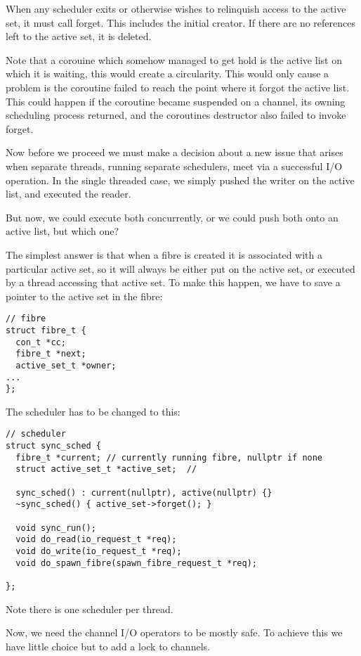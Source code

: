 \documentclass[oneside]{book}
\begin{document}
When any scheduler exits or otherwise wishes to relinquish access to the active
set, it must call forget. This includes the initial creator. If there are no
references left to the active set, it is deleted.

Note that a corouine which somehow managed to get hold is the active list on which it
is waiting, this would create a circularity. This would only cause a problem is the
coroutine failed to reach the point where it forgot the active list. This could
happen if the coroutine became suspended on a channel, its owning scheduling 
process returned, and the coroutines destructor also failed to invoke forget.

Now before we proceed we must make a decision about a new issue that
arises when separate threads, running separate schedulers, meet via
a successful I/O operation. In the single threaded case, we simply
pushed the writer on the active list, and executed the reader.

But now, we could execute both concurrently, or we could push
both onto an active list, but which one?

The simplest answer is that when a fibre is created it is associated with
a particular active set, so it will always be either put on the active set,
or executed by a thread accessing that active set. To make this happen,
we have to save a pointer to the active set in the fibre:

\begin{verbatim}
// fibre
struct fibre_t {
  con_t *cc;
  fibre_t *next;
  active_set_t *owner;
...
};
\end{verbatim}

The scheduler has to be changed to this:

\begin{verbatim}
// scheduler
struct sync_sched {
  fibre_t *current; // currently running fibre, nullptr if none
  struct active_set_t *active_set;  // 

  sync_sched() : current(nullptr), active(nullptr) {}
  ~sync_sched() { active_set->forget(); }

  void sync_run();
  void do_read(io_request_t *req);
  void do_write(io_request_t *req);
  void do_spawn_fibre(spawn_fibre_request_t *req);

};
\end{verbatim}

Note there is one scheduler per thread.

Now, we need the channel I/O operators to be mostly safe. To achieve this
we have little choice but to add a lock to channels.
\end{document}
